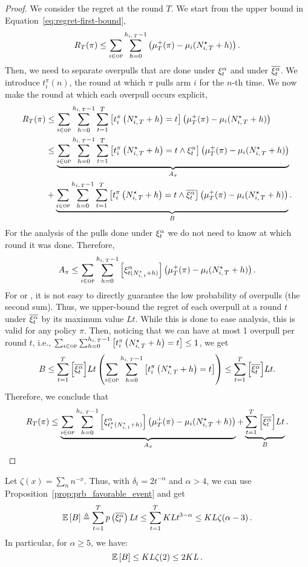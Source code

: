 \begin{proof}
We consider the regret at the round $T$. We start from the upper bound in Equation~\ref{eq:regret-first-bound}, 
\begin{equation}
R_T(\pi) \leq \sum_{i\in \textsc{op}}   \sum_{h=0}^{h_{i,\,T}-1} \left(\mu^+_T(\pi) - \mu_i(N_{i,\,T}^{\star} + h)\right).
\end{equation}
Then, we need to separate overpulls that are done under $\xi^\alpha_t$ and under $\overline{\xi^\alpha_t}$. We introduce $t_i^{\pi}(n)$, the round at which $\pi$ pulls arm $i$ for the $n$-th time. We now make the round at which each overpull occurs  explicit,
\begin{align*}
R_T(\pi) & \leq \sum_{i\in \textsc{op}}   \sum_{h=0}^{h_{i,\,T}-1} \sum_{t=1}^T \left[ t_i^{\pi}\left(N_{i,\,T}^{\star} + h\right) = t \right]  \left(\mu^+_T(\pi) - \mu_i(N_{i,\,T}^{\star} + h)\right)\\
& \leq \underbrace{\sum_{i\in \textsc{op}}   \sum_{h=0}^{h_{i,\,T}-1} \sum_{t=1}^T \left[ t_i^{\pi}\left(N_{i,\,T}^{\star} + h\right) = t \land \xi^\alpha_t \right] \left(\mu^+_T(\pi) - \mu_i(N_{i,\,T}^{\star} + h)\right)}_{A_\pi}\\
&+ \underbrace{\sum_{i\in \textsc{op}}\sum_{h=0}^{h_{i,\,T}-1} \sum_{t=1}^T \left[ t_i^{\pi}\left(N_{i,\,T}^{\star} + h\right) = t \land \overline{\xi^\alpha_t} \right]\left(\mu^+_T(\pi) - \mu_i(N_{i,\,T}^{\star} + h)\right)}_B.
\end{align*}
For the analysis of the pulls done under $\xi^\alpha_t$ we do not need to know at which round it was done. Therefore, 
\[
A_\pi \leq \sum_{i\in \textsc{op}}   \sum_{h=0}^{h_{i,\,T}-1}  \left[ \xi^\alpha_{t(N_{i,\,t}^\star + h)} \right] \left(\mu^+_T(\pi) - \mu_i(N_{i,\,T}^{\star} + h)\right).
\]
For \FEWA or \RUCB, it is not easy to directly guarantee the low probability of overpulls (the second sum). Thus, we upper-bound the regret of each overpull at a round $t$ under $\overline{\xi^\alpha_t}$ by its maximum value $Lt$. While this is done to ease \myAlgorithm analysis, this is valid for any policy $\pi$. Then, noticing that we can have at most 1 overpull per round $t$, i.e., $\sum_{i\in \textsc{op}}\sum_{h=0}^{h_{i,\,T}-1}\left[ t_i^{\pi}\left(N_{i,\,T}^{\star} + h\right) = t  \right] \leq 1$, we get
\[
B \leq  \sum_{t=1}^T \Big[\overline{\xi^\alpha_t}\Big] Lt\left(\sum_{i\in \textsc{op}}\sum_{h=0}^{h_{i,\,T}-1}\left[ t_i^{\pi}\left(N_{i,\,T}^{\star} + h\right) = t  \right]\right) \leq  \sum_{t=1}^T \Big[\overline{\xi^\alpha_t}\Big] Lt.
\]
Therefore, we conclude that
\[
R_T(\pi) \leq \underbrace{\sum_{i\in \textsc{op}} \sum_{h=0}^{h_{i,\,T}-1} \left[ \xi^\alpha_{t_i^\pi(N_{i,\,t}^\star + h)} \right]\left(\mu^+_T(\pi) - \mu_i(N_{i,\,T}^{\star} + h)\right)}_{A_{\pi}} + \underbrace{\sum_{t=1}^T \Big[\overline{\xi^\alpha_t}\Big] Lt}_B. 
\]
\end{proof}
\begin{lemma}
\label{lem:rested-B}
Let $\zeta(x) = \sum_n n^{-x}$. Thus, with $\delta_t = 2t^{-\alpha}$ and $\alpha > 4$, we can use Proposition~\ref{prop:prb_favorable_event} and get
\[
\mathbb{E}\left[B\right] \triangleq \sum_{t=1}^T p\left(\overline{\xi^\alpha_t}\right)Lt \leq \sum_{t=1}^T KLt^{3-\alpha}\leq KL \zeta(\alpha -3)\, .
\]
In particular, for $\alpha \geq 5$, we have:
\[
\mathbb{E}\left[B\right] \leq KL\zeta(2) \leq 2KL\, .
\]
\end{lemma}


